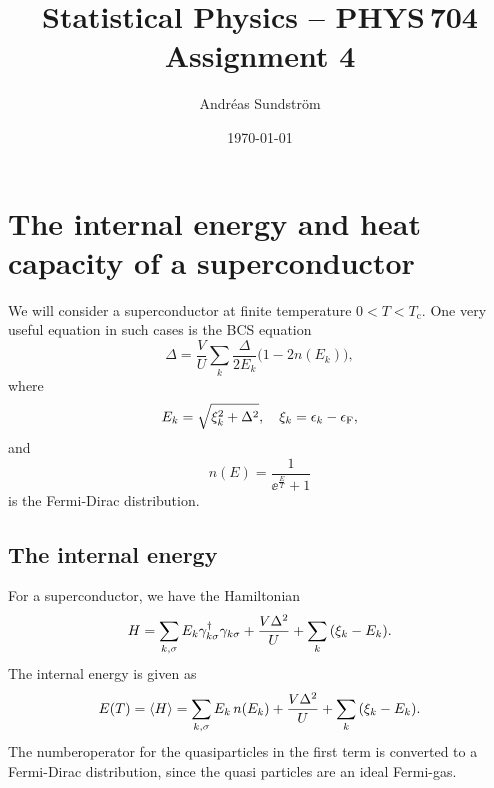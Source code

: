\documentclass[11pt,letter, swedish, english
]{article}
\newcommand{\Tc}{\ensuremath{T_{\text{c}}}}
\newcommand{\eF}{\ensuremath{\epsilon_{\text{F}}}}
\begin{document}




\title{Statistical Physics -- PHYS\,704 \\
Assignment 4}
\author{Andréas Sundström}
\date{\today}

\maketitle


\section{The internal energy and heat capacity of a superconductor}
We will consider a superconductor at finite temperature $0<T<\Tc$. One
very useful equation in such cases is the BCS equation
\begin{equation}\label{eq:BCS}
\Delta=\frac{V}{U}\sum_k \frac{\Delta}{2E_k}\Big(1-2n(E_k)\Big),
\end{equation}
where
\begin{equation}
E_k=\sqrt{\xi_k^2+\Delta^2}\qcomma \xi_k=\epsilon_k-\eF,
\end{equation}
and
\begin{equation}\label{eq:nFD}
n(E)=\frac{1}{\ee^{\frac{E}{T}}+1}
\end{equation}
is the Fermi-Dirac distribution.

\subsection{The internal energy}
For a superconductor, we have the Hamiltonian
\begin{equation}
H=\sum_{k, \sigma} E_k\gamma_{k \sigma}^\dagger\gamma_{k \sigma}
+\frac{V\Delta^2}{U}+\sum_k\qty(\xi_k-E_k).
\end{equation}
The internal energy is given as
\begin{equation}\label{eq:1a_E0}
E(T)=\ev{H}=
\sum_{k, \sigma} E_k\,n(E_k)
+\frac{V\Delta^2}{U}+\sum_k\qty(\xi_k-E_k).
\end{equation}
The numberoperator for the quasiparticles in the first term is
converted to a Fermi-Dirac distribution, since the quasi particles are
an ideal Fermi-gas. 
\end{document}
